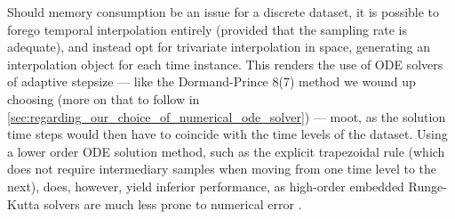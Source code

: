 Should memory consumption be an issue for a discrete dataset, it is possible
to forego temporal interpolation entirely (provided that the sampling rate
is adequate), and instead opt for trivariate interpolation in space, generating
an interpolation object for each time instance. This renders the use of
ODE solvers of adaptive stepsize --- like the Dormand-Prince 8(7) method we
wound up choosing (more on that to follow in
\cref{sec:regarding_our_choice_of_numerical_ode_solver}) --- moot, as the
solution time steps would then have to coincide with the time levels of the
dataset. Using a lower order ODE solution method, such as the explicit
trapezoidal rule (which does not require intermediary samples when moving from
one time level to the next), does, however, yield inferior performance, as
high-order embedded Runge-Kutta solvers are much less prone to numerical error
\parencite{loken2017sensitivity}.



